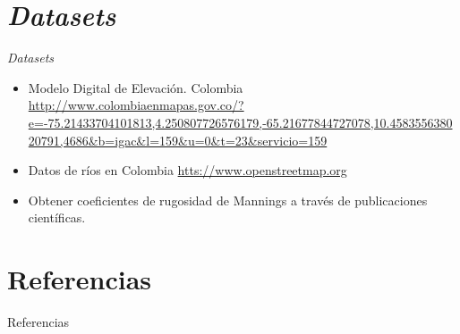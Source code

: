 \documentclass[17pt, t, lualatex]{beamer}
\begin{document}
\section{\textit{Datasets}}

\insertsectionpage

\begin{frame}[allowframebreaks]{\textit{Datasets}}

\begin{itemize}
  \item Modelo Digital de Elevación. Colombia \url{http://www.colombiaenmapas.gov.co/?e=-75.21433704101813,4.250807726576179,-65.21677844727078,10.458355638020791,4686&b=igac&l=159&u=0&t=23&servicio=159}
  \item Datos de ríos en Colombia \url{htts://www.openstreetmap.org}
  \item Obtener coeficientes de rugosidad de Mannings a través de publicaciones científicas.
\end{itemize}


\end{frame}




\section{Referencias}

\insertsectionpage
\begin{frame}[allowframebreaks]{Referencias}
  \printbibliography
\end{frame}


\insertendpage
\end{document}
